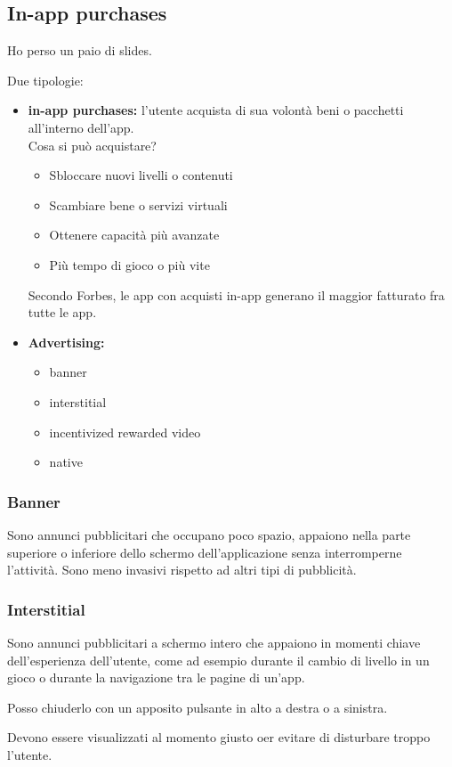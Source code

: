 \subsection{In-app purchases}
\par Ho perso un paio di slides.
\par Due tipologie:
\begin{itemize}
    \item \textbf{in-app purchases:} l'utente acquista di sua volontà beni o pacchetti all'interno dell'app.\\ Cosa si può acquistare?
    \begin{itemize}
        \item Sbloccare nuovi livelli o contenuti
        \item Scambiare bene o servizi virtuali
        \item Ottenere capacità più avanzate
        \item Più tempo di gioco o più vite
    \end{itemize}
    Secondo Forbes, le app con acquisti in-app generano il maggior fatturato fra tutte le app.
    \item \textbf{Advertising:} 
    \begin{itemize}
        \item banner
        \item interstitial
        \item incentivized rewarded video
        \item native
    \end{itemize}
\end{itemize}

\subsubsection{Banner}
\par Sono annunci pubblicitari che occupano poco spazio, appaiono nella parte superiore o inferiore dello schermo dell'applicazione senza interromperne l'attività. Sono meno invasivi rispetto ad altri tipi di pubblicità.

\subsubsection{Interstitial}
\par Sono annunci pubblicitari a schermo intero che appaiono in momenti chiave dell'esperienza dell'utente, come ad esempio durante il cambio di livello in un gioco o durante la navigazione tra le pagine di un'app. 
\par Posso chiuderlo con un apposito pulsante in alto a destra o a sinistra.
\par Devono essere visualizzati al momento giusto oer evitare di disturbare troppo l'utente. 

